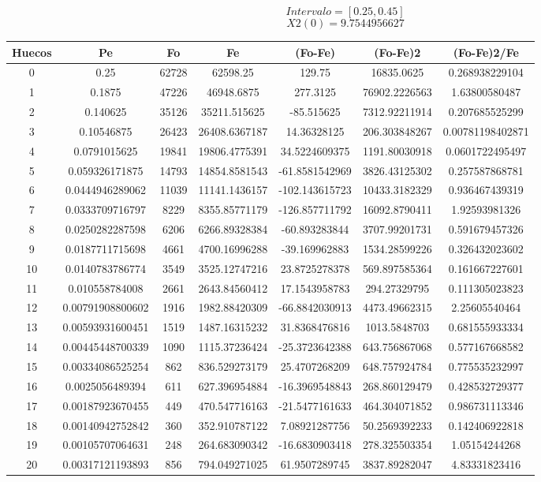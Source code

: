 \documentclass{article}
\begin{document}
$$
Intervalo = [0.25, 0.45]
$$
$$
X2(0) = 9.7544956627
$$
\begin{tabular}{|c|c|c|c|c|c|c|}
Huecos&Pe&Fo&Fe&(Fo{-}Fe)&(Fo{-}Fe)2&(Fo{-}Fe)2/Fe\\
\hline
0&0.25&62728&62598.25&129.75&16835.0625&0.268938229104\\
\hline
1&0.1875&47226&46948.6875&277.3125&76902.2226563&1.63800580487\\
\hline
2&0.140625&35126&35211.515625&{-}85.515625&7312.92211914&0.207685525299\\
\hline
3&0.10546875&26423&26408.6367187&14.36328125&206.303848267&0.00781198402871\\
\hline
4&0.0791015625&19841&19806.4775391&34.5224609375&1191.80030918&0.0601722495497\\
\hline
5&0.059326171875&14793&14854.8581543&{-}61.8581542969&3826.43125302&0.257587868781\\
\hline
6&0.0444946289062&11039&11141.1436157&{-}102.143615723&10433.3182329&0.936467439319\\
\hline
7&0.0333709716797&8229&8355.85771179&{-}126.857711792&16092.8790411&1.92593981326\\
\hline
8&0.0250282287598&6206&6266.89328384&{-}60.893283844&3707.99201731&0.591679457326\\
\hline
9&0.0187711715698&4661&4700.16996288&{-}39.169962883&1534.28599226&0.326432023602\\
\hline
10&0.0140783786774&3549&3525.12747216&23.8725278378&569.897585364&0.161667227601\\
\hline
11&0.010558784008&2661&2643.84560412&17.1543958783&294.27329795&0.111305023823\\
\hline
12&0.00791908800602&1916&1982.88420309&{-}66.8842030913&4473.49662315&2.25605540464\\
\hline
13&0.00593931600451&1519&1487.16315232&31.8368476816&1013.5848703&0.681555933334\\
\hline
14&0.00445448700339&1090&1115.37236424&{-}25.3723642388&643.756867068&0.577167668582\\
\hline
15&0.00334086525254&862&836.529273179&25.4707268209&648.757924784&0.775535232997\\
\hline
16&0.0025056489394&611&627.396954884&{-}16.3969548843&268.860129479&0.428532729377\\
\hline
17&0.00187923670455&449&470.547716163&{-}21.5477161633&464.304071852&0.986731113346\\
\hline
18&0.00140942752842&360&352.910787122&7.08921287756&50.2569392233&0.142406922818\\
\hline
19&0.00105707064631&248&264.683090342&{-}16.6830903418&278.325503354&1.05154244268\\
\hline
20&0.00317121193893&856&794.049271025&61.9507289745&3837.89282047&4.83331823416\\
\end{tabular}
\end{document}
